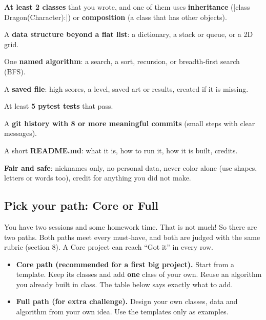 \documentclass[level=3]{kidscode}
\begin{document}
\begin{selfcheck}
  \item \textbf{At least 2 classes} that you wrote, and one of them uses \textbf{inheritance}
        (\py|class Dragon(Character):|) or \textbf{composition} (a class that has other objects).
  \item A \textbf{data structure beyond a flat list}: a dictionary, a stack or queue, or a 2D grid.
  \item One \textbf{named algorithm}: a search, a sort, recursion, or breadth-first search (BFS).
  \item A \textbf{saved file}: high scores, a level, saved art or results, created if it is missing.
  \item At least \textbf{5 pytest tests} that pass.
  \item A \textbf{git history with 8 or more meaningful commits} (small steps with clear messages).
  \item A short \textbf{README.md}: what it is, how to run it, how it is built, credits.
  \item \textbf{Fair and safe}: nicknames only, no personal data, never color alone (use shapes,
        letters or words too), credit for anything you did not make.
\end{selfcheck}

\subsection{Pick your path: Core or Full}
You have two sessions and some homework time. That is not much! So there are two paths. Both
paths meet every must-have, and both are judged with the same rubric (section 8). A Core
project can reach \enquote{Got it} in every row.

\begin{itemize}[itemsep=2pt]
  \item \textbf{Core path (recommended for a first big project).} Start from a template. Keep its
        classes and add \textbf{one} class of your own. Reuse an algorithm you already built in
        class. The table below says exactly what to add.
  \item \textbf{Full path (for extra challenge).} Design your own classes, data and algorithm
        from your own idea. Use the templates only as examples.
\end{itemize}
\end{document}
